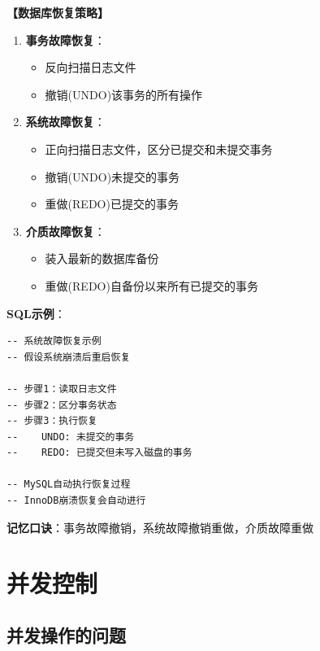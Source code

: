 \documentclass[12pt, a4paper]{article}
\newenvironment{bluebox}[1]{%
  \begin{trivlist}
  \item[\hskip\labelsep \textbf{#1}]
  \setlength{\parskip}{0.5ex}
  \setlength{\itemsep}{0.5ex}
}{%
  \end{trivlist}
  }
\begin{document}
\begin{bluebox}{恢复策略}
	\textbf{【数据库恢复策略】}

	\begin{enumerate}[leftmargin=*, label=\textbf{\arabic*.}]
		\item \textbf{事务故障恢复}：
		      \begin{itemize}[nosep]
			      \item 反向扫描日志文件
			      \item 撤销(UNDO)该事务的所有操作
		      \end{itemize}

		\item \textbf{系统故障恢复}：
		      \begin{itemize}[nosep]
			      \item 正向扫描日志文件，区分已提交和未提交事务
			      \item 撤销(UNDO)未提交的事务
			      \item 重做(REDO)已提交的事务
		      \end{itemize}

		\item \textbf{介质故障恢复}：
		      \begin{itemize}[nosep]
			      \item 装入最新的数据库备份
			      \item 重做(REDO)自备份以来所有已提交的事务
		      \end{itemize}
	\end{enumerate}

	\textbf{SQL示例}：
	\begin{verbatim}
-- 系统故障恢复示例
-- 假设系统崩溃后重启恢复

-- 步骤1：读取日志文件
-- 步骤2：区分事务状态
-- 步骤3：执行恢复
--    UNDO: 未提交的事务
--    REDO: 已提交但未写入磁盘的事务

-- MySQL自动执行恢复过程
-- InnoDB崩溃恢复会自动进行
	\end{verbatim}

	\textbf{记忆口诀}：事务故障撤销，系统故障撤销重做，介质故障重做
\end{bluebox}

\section{并发控制}

\subsection{并发操作的问题}
\end{document}
